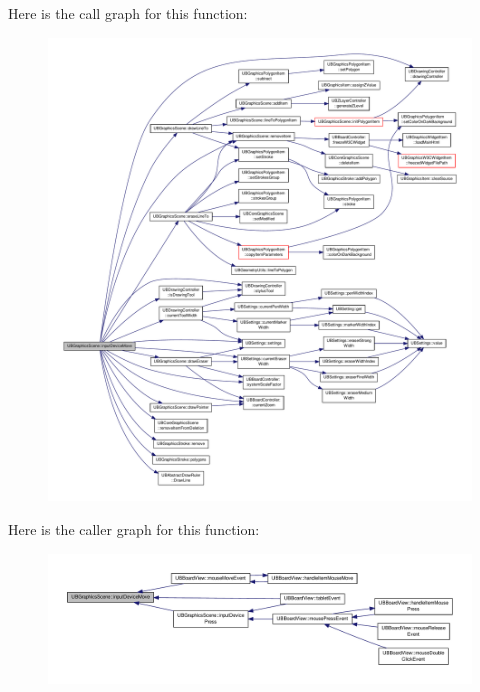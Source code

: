Here is the call graph for this function\-:
\nopagebreak
\begin{figure}[H]
\begin{center}
\leavevmode
\includegraphics[width=350pt]{dc/db2/class_u_b_graphics_scene_a9354a46739a316286901ebd12b2bcf1b_cgraph}
\end{center}
\end{figure}




Here is the caller graph for this function\-:
\nopagebreak
\begin{figure}[H]
\begin{center}
\leavevmode
\includegraphics[width=350pt]{dc/db2/class_u_b_graphics_scene_a9354a46739a316286901ebd12b2bcf1b_icgraph}
\end{center}
\end{figure}


